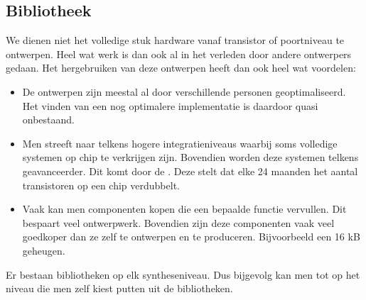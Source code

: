 \subsection{Bibliotheek}
\label{ss:bibliotheek}
We dienen niet het volledige stuk hardware vanaf transistor of poortniveau te ontwerpen. Heel wat werk is dan ook al in het verleden door andere ontwerpers gedaan. Het hergebruiken van deze ontwerpen heeft dan ook heel wat voordelen:
\begin{itemize}
 \item De ontwerpen zijn meestal al door verschillende personen geoptimaliseerd. Het vinden van een nog optimalere implementatie is daardoor quasi onbestaand.
 \item Men streeft naar telkens hogere integratieniveaus waarbij soms volledige systemen op chip te verkrijgen zijn. Bovendien worden deze systemen telkens geavanceerder. Dit komt door de . Deze stelt dat elke 24 maanden het aantal transistoren op een chip verdubbelt.
 \item Vaak kan men componenten kopen die een bepaalde functie vervullen. Dit bespaart veel ontwerpwerk. Bovendien zijn deze componenten vaak veel goedkoper dan ze zelf te ontwerpen en te produceren. Bijvoorbeeld een 16 kB geheugen.
\end{itemize}
Er bestaan bibliotheken op elk syntheseniveau. Dus bijgevolg kan men tot op het niveau die men zelf kiest putten uit de bibliotheken.
